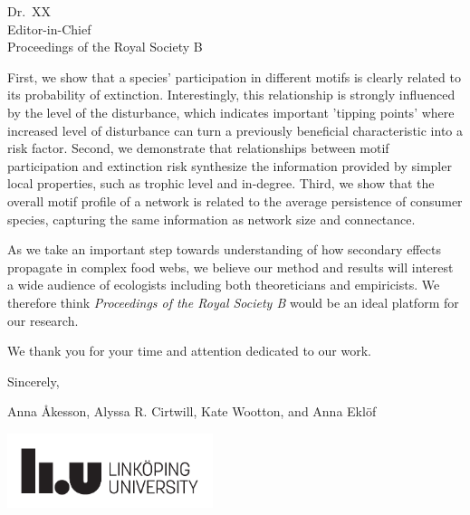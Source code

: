 \documentclass[10.5pt]{letter}
\begin{document}
\begin{letter}{
\vspace{-2.5cm}

Dr.~XX\\
Editor-in-Chief\\
Proceedings of the Royal Society B}
First, we show that a species' participation in different motifs is clearly related to its probability of extinction. Interestingly, this relationship is strongly influenced by the level of the disturbance, which indicates important 'tipping points' where increased level of disturbance can turn a previously beneficial characteristic into a risk factor. 
Second, we demonstrate that relationships between motif participation and extinction risk synthesize the information provided by simpler local properties, such as trophic level and in-degree. 
Third, we show that the overall motif profile of a network is related to the average persistence of consumer species, capturing the same information as network size and connectance. 

As we take an important step towards understanding of how secondary effects propagate in complex food webs, we believe our method and results will interest a wide audience of ecologists including both theoreticians and empiricists. We therefore think \emph{ Proceedings of the Royal Society B} would be an ideal platform for our research.

We thank you for your time and attention dedicated to our work.


\vspace{2\parskip}

\hspace{4\parskip} Sincerely,

\hspace{4\parskip} Anna {\AA}kesson, Alyssa R. Cirtwill, Kate Wootton, and Anna Ekl\"of

\vspace{4\parskip}
\centering
\includegraphics[width=60mm]{manuscript/figures/LiU_primary_black.pdf}


\end{letter} 
\end{document}
